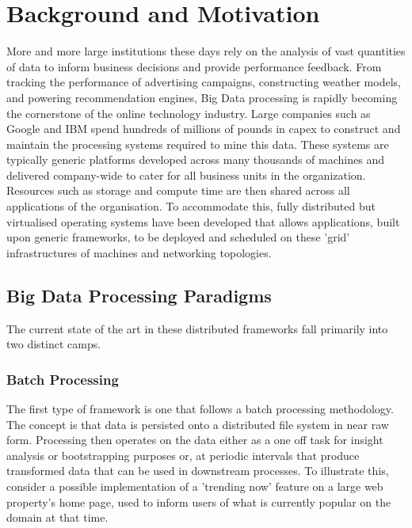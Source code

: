 \documentclass[a4paper,11pt]{scrreprt}
\begin{document}
\tableofcontents

\chapter{Background and Motivation}
More and more large institutions these days rely on the analysis of vast quantities of data to inform business decisions and provide performance feedback. From tracking the performance of advertising campaigns, constructing weather models, and powering recommendation engines, Big Data processing is rapidly becoming the cornerstone of the online technology industry. Large companies such as Google and IBM spend hundreds of millions of pounds in capex to construct and maintain the processing systems required to mine this data. These systems are typically generic platforms developed across many thousands of machines and delivered company-wide to cater for all business units in the organization. Resources such as storage and compute time are then shared across all applications of the organisation. To accommodate this, fully distributed but virtualised operating systems have been developed that allows applications, built upon generic frameworks, to be deployed and scheduled on these 'grid' infrastructures of machines and networking topologies.\\

\section{Big Data Processing Paradigms}
The current state of the art in these distributed frameworks fall primarily into two distinct camps.
\subsection{Batch Processing}
The first type of framework is one that follows a batch processing methodology. The concept is that data is persisted onto a distributed file system in near raw form. Processing then operates on the data either as a one off task for insight analysis or bootstrapping purposes or, at periodic intervals that produce transformed data that can be used in downstream processes. To illustrate this, consider a possible implementation of a 'trending now' feature on a large web property's home page, used to inform users of what is currently popular on the domain at that time. \\
\end{document}

